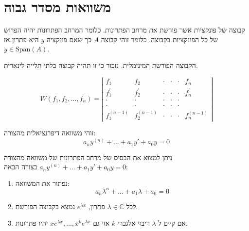 \documentclass{tstextbook}
\begin{document}
\section{משוואות מסדר גבוה}

\begin{definition}
קבוצה של פונקציות אשר פורשת את מרחב הפתרונות. כלומר המרחב הפתרונות יהיה הפרוש של כל הפונקציות בקבוצה. כלומר זוהי קבוצה \(A\) כך שאם פונקציה \(y\) היא פתרון אז \(y \in \mathrm{Span}(A)\).

\end{definition}
\begin{definition}
הקבוצה הפורשת המינימלית. נזכור כי זו תהיה קבוצה בלתי תלייה לינארית.

\end{definition}
\begin{definition}[וורונסקיאן]
$$W(f_{1},f_{2},\ldots,f_{n})=\left|\begin{array}{cccc}f_{1}&f_{2}&\cdot&\cdot&\cdot&f_{n}\\ f_{1}^{\prime}&f_{2}^{\prime}&\cdot&\cdot&\cdot&f_{n}^{\prime}\\ \cdot&\cdot&\cdot&\cdot&\cdot\\ \cdot&\cdot&\cdot&\cdot&\cdot\\ f_{1}^{(n-1)}&f_{2}^{(n-1)}&\cdot&\cdot&\cdot&f_{n}^{(n-1)}\end{array}\right|$$

\end{definition}
\begin{definition}
זוהי משוואה דיפרנציאלית מהצורה:
$$a_n y^{(n)} + ...+ a_1 y' + a_0 y = 0$$

\end{definition}
\begin{proposition}
ניתן למצוא את הבסיס של מרחב הפתרונות של משוואה מהצורה \(a_n y^{(n)} + ...+ a_1 y' + a_0 y = 0\) בצורה הבאה:

  \begin{enumerate}
    \item נפתור את המשוואה: 
$$a_n \lambda^n + ... + a_1\lambda + a_0=0$$


    \item לכל \(\lambda \in \mathbb{C}\) פתרון, \(e^{\lambda x}\) נמצא בקבוצה הפורשת.  


    \item אם קיים ל-\(\lambda\) ריבוי אלגברי \(k\) אזי גם \(xe^{ \lambda x },\dots,x^{k}e^{ \lambda x }\) יהיו פתרונות. 


  \end{enumerate}
\end{proposition}
\end{document}
